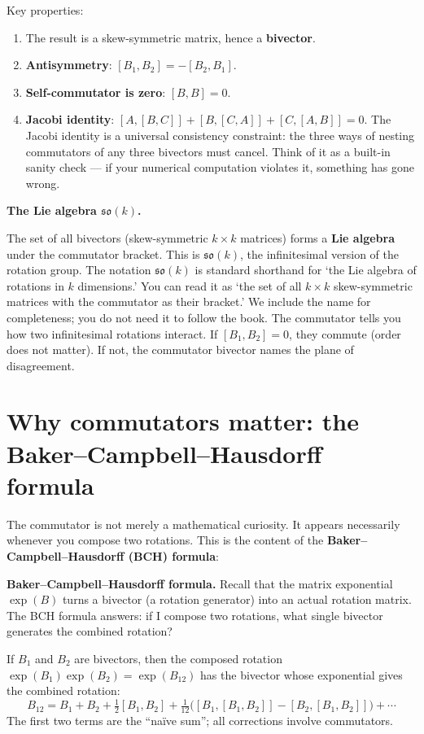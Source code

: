 \documentclass[11pt, twoside, openright]{memoir}
\numberwithin{equation}{chapter}
\begin{document}
Key properties:
\begin{enumerate}[nosep]
\item The result is a skew-symmetric matrix, hence a \textbf{bivector}.
\item \textbf{Antisymmetry}: $[B_1, B_2] = -[B_2, B_1]$.
\item \textbf{Self-commutator is zero}: $[B, B] = 0$.
\item \textbf{Jacobi identity}:
  $[A,[B,C]] + [B,[C,A]] + [C,[A,B]] = 0$.
  The Jacobi identity is a universal consistency constraint: the three ways of nesting commutators of any three bivectors must cancel. Think of it as a built-in sanity check --- if your numerical computation violates it, something has gone wrong.
\end{enumerate}

\begin{gabox}
\textbf{The Lie algebra $\mathfrak{so}(k)$.}

The set of all bivectors (skew-symmetric $k \times k$ matrices) forms a
\textbf{Lie algebra} under the commutator bracket.  This is
$\mathfrak{so}(k)$, the infinitesimal version of the rotation group.
The notation $\mathfrak{so}(k)$ is standard shorthand for `the Lie algebra of rotations in $k$ dimensions.' You can read it as `the set of all $k \times k$ skew-symmetric matrices with the commutator as their bracket.' We include the name for completeness; you do not need it to follow the book.
The commutator tells you how two infinitesimal rotations interact.  If
$[B_1, B_2] = 0$, they commute (order does not matter).  If not, the
commutator bivector names the plane of disagreement.
\end{gabox}

\section{Why commutators matter: the Baker--Campbell--Hausdorff formula}

The commutator is not merely a mathematical curiosity.  It appears
necessarily whenever you compose two rotations.  This is the content of
the \textbf{Baker--Campbell--Hausdorff (BCH) formula}:

\begin{gabox}
\textbf{Baker--Campbell--Hausdorff formula.}
Recall that the matrix exponential $\exp(B)$ turns a bivector (a rotation generator) into an actual rotation matrix. The BCH formula answers: if I compose two rotations, what single bivector generates the combined rotation?

If $B_1$ and $B_2$ are bivectors, then the composed rotation
$\exp(B_1)\exp(B_2) = \exp(B_{12})$ has the bivector whose exponential gives the combined rotation:
\begin{equation}
  B_{12} = B_1 + B_2 + \tfrac{1}{2}[B_1, B_2]
    + \tfrac{1}{12}\bigl([B_1, [B_1, B_2]] - [B_2, [B_1, B_2]]\bigr)
    + \cdots
\end{equation}
The first two terms are the ``na\"ive sum''; all corrections involve
commutators.
\end{gabox}
\end{document}
